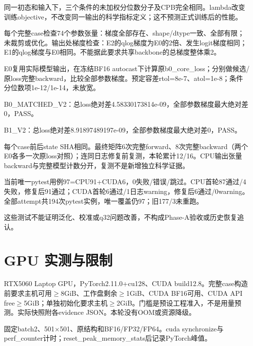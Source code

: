 \documentclass[UTF8,fontset=fandol,10pt]{ctexart}
\begin{document}
同一初态和输入下，三个条件的未加权分位数分子及CPB完全相同。lambda改变训练objective，不改变同一输出的科学指标定义；这不预测正式训练后的性能。

每个完整case检查74个参数张量：梯度全部存在、shape/\allowbreak{}dtype一致、全部有限；未裁剪或优化。输出处梯度检查：E2的qlog梯度为E0的2倍、发生logit梯度相同；E1的qlog梯度与E0相同。不能据此要求共享backbone的总梯度整体乘2。

E0复用实际模型输出，在冻结BF16 autocast下计算原b0\_\allowbreak{}core\_\allowbreak{}loss；分别做候选/\allowbreak{}原loss完整backward，比较全部参数梯度。预定容差rtol=8e-7、atol=1e-8；条件分位数项1e-12/\allowbreak{}1e-14，未放宽。

B0\_\allowbreak{}MATCHED\_\allowbreak{}V2：总loss绝对差4.58330173814e-09，全部参数梯度最大绝对差0，PASS。

B1\_\allowbreak{}V2：总loss绝对差8.91897489197e-09，全部参数梯度最大绝对差0，PASS。

每个case前后state SHA相同。最终矩阵6次完整forward、8次完整backward（两个E0各多一次原loss对照）；连同日志修复前复测，本轮累计12/\allowbreak{}16。CPU输出张量backward与完整模型计数分开，复测不是新增独立科学证据。

当前唯一pytest用例97=CPU91+CUDA6，0失败/\allowbreak{}错误/\allowbreak{}跳过。CPU首轮87通过/\allowbreak{}4失败，修复后91通过；CUDA首轮6通过/\allowbreak{}1日志warning，修复后6通过/\allowbreak{}0warning。全部attempt共194次pytest实例，唯一覆盖仍97；旧177/\allowbreak{}3未重跑。

这些测试不能证明泛化、校准或q32问题改善，不构成Phase-A验收或历史恢复追认。
\clearpage\section{GPU 实测与限制}

RTX5060 Laptop GPU，PyTorch2.11.0+cu128、CUDA build12.8。完整case构造前要求主机可用\(\ge\)8GiB、工作盘剩余\(\ge\)1GiB、CUDA BF16可用、CUDA API free\(\ge\)5GiB；单独初始化要求主机\(\ge\)2GiB。门槛是预设工程准入，不是用量预测。实际快照附各evidence JSON。本轮没有OOM或资源降级。

固定batch2、501\(\times\)501、原结构和BF16/\allowbreak{}FP32/\allowbreak{}FP64。cuda synchronize与perf\_\allowbreak{}counter计时；reset\_\allowbreak{}peak\_\allowbreak{}memory\_\allowbreak{}stats后记录PyTorch峰值。
\end{document}
